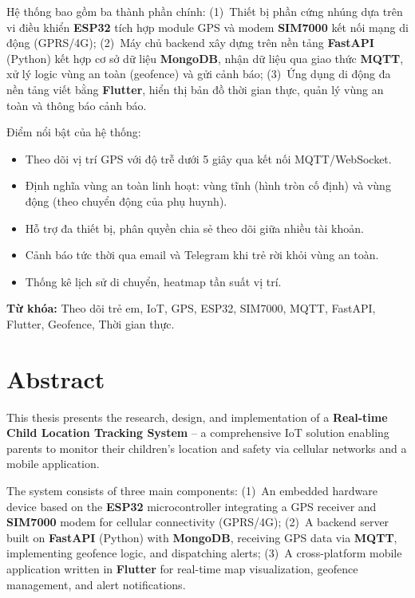 \documentclass[13pt, a4paper]{report}
\begin{document}
\medskip
Hệ thống bao gồm ba thành phần chính: (1)~Thiết bị phần cứng nhúng dựa trên vi điều khiển \textbf{ESP32} tích hợp module GPS và modem \textbf{SIM7000} kết nối mạng di động (GPRS/4G); (2)~Máy chủ backend xây dựng trên nền tảng \textbf{FastAPI} (Python) kết hợp cơ sở dữ liệu \textbf{MongoDB}, nhận dữ liệu qua giao thức \textbf{MQTT}, xử lý logic vùng an toàn (geofence) và gửi cảnh báo; (3)~Ứng dụng di động đa nền tảng viết bằng \textbf{Flutter}, hiển thị bản đồ thời gian thực, quản lý vùng an toàn và thông báo cảnh báo.

\medskip
Điểm nổi bật của hệ thống:
\begin{itemize}[noitemsep]
  \item Theo dõi vị trí GPS với độ trễ dưới 5 giây qua kết nối MQTT/WebSocket.
  \item Định nghĩa vùng an toàn linh hoạt: vùng tĩnh (hình tròn cố định) và vùng động (theo chuyển động của phụ huynh).
  \item Hỗ trợ đa thiết bị, phân quyền chia sẻ theo dõi giữa nhiều tài khoản.
  \item Cảnh báo tức thời qua email và Telegram khi trẻ rời khỏi vùng an toàn.
  \item Thống kê lịch sử di chuyển, heatmap tần suất vị trí.
\end{itemize}

\medskip
\noindent\textbf{Từ khóa:} Theo dõi trẻ em, IoT, GPS, ESP32, SIM7000, MQTT, FastAPI, Flutter, Geofence, Thời gian thực.

\clearpage

\chapter*{Abstract}

This thesis presents the research, design, and implementation of a \textbf{Real-time Child Location Tracking System} -- a comprehensive IoT solution enabling parents to monitor their children's location and safety via cellular networks and a mobile application.

\medskip
The system consists of three main components: (1)~An embedded hardware device based on the \textbf{ESP32} microcontroller integrating a GPS receiver and \textbf{SIM7000} modem for cellular connectivity (GPRS/4G); (2)~A backend server built on \textbf{FastAPI} (Python) with \textbf{MongoDB}, receiving GPS data via \textbf{MQTT}, implementing geofence logic, and dispatching alerts; (3)~A cross-platform mobile application written in \textbf{Flutter} for real-time map visualization, geofence management, and alert notifications.
\end{document}
